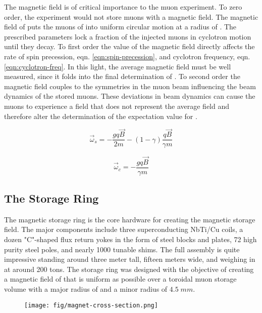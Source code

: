 The magnetic field is of critical importance to the muon \gmtwo experiment. To zero order, the experiment would not store muons with a magnetic field.  The magnetic field of \bmagic puts the muons of \rmagic into uniform circular motion at a radius of \pmagic.  The prescribed parameters lock a fraction of the injected muons in cyclotron motion until they decay.  To first order the value of the magnetic field directly affects the rate of spin precession, eqn. \ref{eqn:spin-precession}, and cyclotron frequency, eqn. \ref{eqn:cyclotron-freq}.  In this light, the average magnetic field must be well measured, since it folds into the final determination of \wa.  To second order the magnetic field couples to the symmetries in the muon beam influencing the beam dynamics of the stored muons.  These deviations in beam dynamics can cause the muons to experience a field that does not represent the average field and therefore alter the determination of the expectation value for \wa.

\begin{equation}
\vec{\omega}_s = -\frac{gq\vec{B}}{2m} - (1 - \gamma) \frac{q\vec{B}}{\gamma m}
\label{eqn:spin-precession}
\end{equation}

\begin{equation}
\vec{\omega}_c = -\frac{gq\vec{B}}{\gamma m}
\label{eqn:cyclotron-freq}
\end{equation}

\subsection{The Storage Ring}

The magnetic storage ring is the core hardware for creating the magnetic storage field.  The major components include three superconducting NbTi/Cu coils, a dozen "C"-shaped flux return yokes in the form of steel blocks and plates, 72 high purity steel poles, and nearly 1000 tunable shims.  The full assembly is quite impressive standing around three meter tall, fifteen meters wide, and weighing in at around 200 tons.  The storage ring was designed with the objective of creating a magnetic field of \bmagic that is uniform as possible over a toroidal muon storage volume with a major radius of \rmagic and a minor radius of $4.5\;mm$.

\begin{figure}
\texttt{[image: fig/magnet-cross-section.png]}
\caption{}
\label{fig:magnet-cross-section}
\end{figure}

